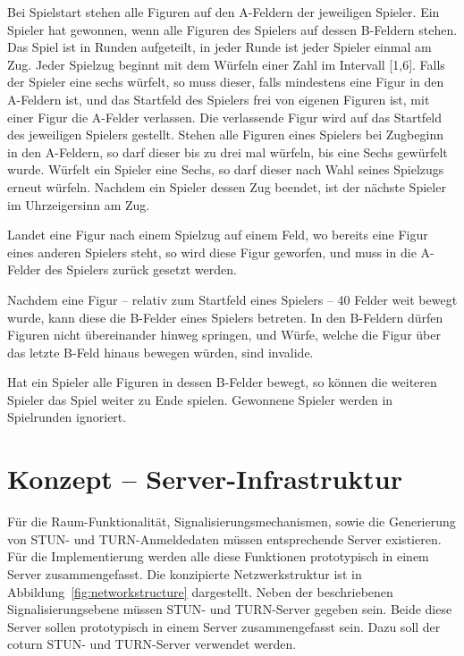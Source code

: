 Bei Spielstart stehen alle Figuren auf den A-Feldern der jeweiligen Spieler. Ein Spieler hat gewonnen, wenn alle Figuren des Spielers auf dessen B-Feldern stehen. Das Spiel ist in Runden aufgeteilt, in jeder Runde ist jeder Spieler einmal am Zug. Jeder Spielzug beginnt mit dem Würfeln einer Zahl im Intervall [1,6]. Falls der Spieler eine sechs würfelt, so muss dieser, falls mindestens eine Figur in den A-Feldern ist, und das Startfeld des Spielers frei von eigenen Figuren ist, mit einer Figur die A-Felder verlassen. Die verlassende Figur wird auf das Startfeld des jeweiligen Spielers gestellt. Stehen alle Figuren eines Spielers bei Zugbeginn in den A-Feldern, so darf dieser bis zu drei mal würfeln, bis eine Sechs gewürfelt wurde. Würfelt ein Spieler eine Sechs, so darf dieser nach Wahl seines Spielzugs erneut würfeln. Nachdem ein Spieler dessen Zug beendet, ist der nächste Spieler im Uhrzeigersinn am Zug.\par

Landet eine Figur nach einem Spielzug auf einem Feld, wo bereits eine Figur eines anderen Spielers steht, so wird diese Figur \glqq{}geworfen\grqq{}, und muss in die A-Felder des Spielers zurück gesetzt werden.\par

Nachdem eine Figur -- relativ zum Startfeld eines Spielers -- 40 Felder weit bewegt wurde, kann diese die B-Felder eines Spielers betreten. In den B-Feldern dürfen Figuren nicht übereinander hinweg springen, und Würfe, welche die Figur über das letzte B-Feld hinaus bewegen würden, sind invalide.\par

Hat ein Spieler alle Figuren in dessen B-Felder bewegt, so können die weiteren Spieler das Spiel weiter zu Ende spielen. Gewonnene Spieler werden in Spielrunden ignoriert.\par

\section{Konzept -- Server-Infrastruktur}
Für die Raum-Funktionalität, Signalisierungsmechanismen, sowie die Generierung von STUN- und TURN-Anmeldedaten müssen entsprechende Server existieren. Für die Implementierung werden alle diese Funktionen prototypisch in einem Server zusammengefasst. Die konzipierte Netzwerkstruktur ist in Abbildung~\ref{fig:networkstructure} dargestellt. Neben der beschriebenen Signalisierungsebene müssen \acs{STUN}- und \acs{TURN}-Server gegeben sein. Beide diese Server sollen prototypisch in einem Server zusammengefasst sein. Dazu soll der \glqq{}coturn\grqq{} STUN- und TURN-Server verwendet werden.

